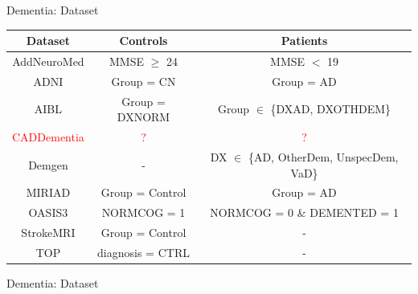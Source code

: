 \documentclass[c]{beamer}
\begin{document}
	\begin{frame}{Dementia: Dataset} %
		\centering
	    \begin{tabular}{|c|c|c|}
            \hline
             \textbf{\scriptsize{Dataset}}&\textbf{\scriptsize{Controls}}&\textbf{\scriptsize{Patients}}\\
            \hline
            \scriptsize{AddNeuroMed}&\scriptsize{MMSE $\geq$ 24}&\scriptsize{MMSE $<$ 19}\\
            \hline
            \scriptsize{ADNI}&\scriptsize{Group = CN}&\scriptsize{Group = AD}\\
            \hline
            \scriptsize{AIBL}&\scriptsize{Group = DXNORM}&\scriptsize{Group $\in$ \{DXAD, DXOTHDEM\}}\\
            \hline
            \scriptsize{\textcolor{red}{CADDementia}}&\scriptsize{\textcolor{red}{?}}&\scriptsize{\textcolor{red}{?}}\\
            \hline
            \scriptsize{Demgen}&\scriptsize{-}&\scriptsize{DX $\in$ \{AD, OtherDem, UnspecDem, VaD\}}\\
            \hline
            \scriptsize{MIRIAD}&\scriptsize{Group = Control}&\scriptsize{Group = AD}\\
            \hline
            \scriptsize{OASIS3}&\scriptsize{NORMCOG = 1}&\scriptsize{NORMCOG = 0 \& DEMENTED = 1}\\
            \hline
            \scriptsize{StrokeMRI}&\scriptsize{Group = Control}&\scriptsize{-}\\
            \hline
            \scriptsize{TOP}&\scriptsize{diagnosis = CTRL}&\scriptsize{-}\\
            \hline
        \end{tabular}
	\end{frame}	
	
	\begin{frame}{Dementia: Dataset} %
		\dementiatimepoints
		
		
		\centering
	\end{frame}
	
\end{document}
